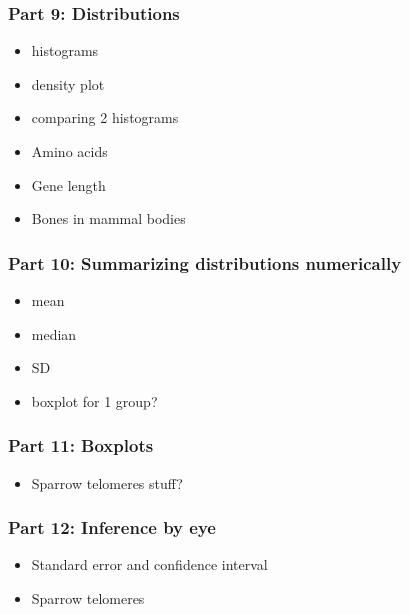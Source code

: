 \documentclass[
]{book}
\providecommand{\tightlist}{%
  \setlength{\itemsep}{0pt}\setlength{\parskip}{0pt}}
\begin{document}
\hypertarget{part-9-distributions}{%
\subsubsection{Part 9: Distributions}\label{part-9-distributions}}

\begin{itemize}
\tightlist
\item
  histograms
\item
  density plot
\item
  comparing 2 histograms
\item
  Amino acids
\item
  Gene length
\item
  Bones in mammal bodies
\end{itemize}

\hypertarget{part-10-summarizing-distributions-numerically}{%
\subsubsection{Part 10: Summarizing distributions numerically}\label{part-10-summarizing-distributions-numerically}}

\begin{itemize}
\tightlist
\item
  mean
\item
  median
\item
  SD
\item
  boxplot for 1 group?
\end{itemize}

\hypertarget{part-11-boxplots}{%
\subsubsection{Part 11: Boxplots}\label{part-11-boxplots}}

\begin{itemize}
\tightlist
\item
  Sparrow telomeres stuff?
\end{itemize}

\hypertarget{part-12-inference-by-eye}{%
\subsubsection{Part 12: Inference by eye}\label{part-12-inference-by-eye}}

\begin{itemize}
\tightlist
\item
  Standard error and confidence interval
\item
  Sparrow telomeres
\end{itemize}
\end{document}
